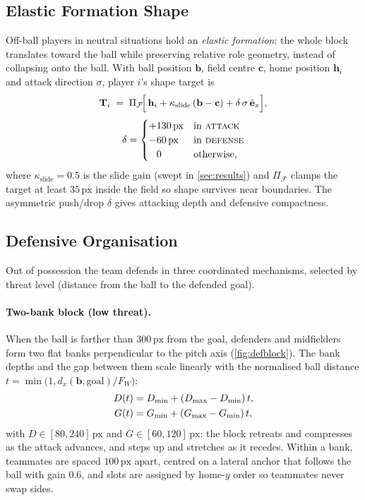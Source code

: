 \documentclass[10pt,twocolumn]{article}
\newcommand{\px}{\ensuremath{\,\mathrm{px}}}
\begin{document}
\subsection{Elastic Formation Shape}\label{sec:formation}

Off-ball players in neutral situations hold an \emph{elastic formation}: the
whole block translates toward the ball while preserving relative role
geometry, instead of collapsing onto the ball. With ball position
$\mathbf b$, field centre $\mathbf c$, home position $\mathbf h_i$ and
attack direction $\sigma$, player $i$'s shape target is
\begin{equation}\label{eq:formation}
\mathbf T_i \;=\; \Pi_{\mathcal F}\!\Bigl[\,\mathbf h_i
   + \kappa_{\text{slide}}\,(\mathbf b - \mathbf c)
   + \delta\,\sigma\,\hat{\mathbf e}_x \Bigr],
\end{equation}
\begin{equation}\label{eq:pushdrop}
\delta =
\begin{cases}
+130\px & \text{in \textsc{attack}} \\
-60\px & \text{in \textsc{defense}} \\
\hphantom{+}0 & \text{otherwise,}
\end{cases}
\end{equation}
where $\kappa_{\text{slide}} = 0.5$ is the slide gain (swept in
\cref{sec:results}) and $\Pi_{\mathcal F}$ clamps the target at least
$35\px$ inside the field so shape survives near boundaries. The
asymmetric push/drop $\delta$ gives attacking depth and defensive
compactness.

\subsection{Defensive Organisation}\label{sec:defense}

Out of possession the team defends in three coordinated mechanisms,
selected by threat level (distance from the ball to the defended goal).

\paragraph{Two-bank block (low threat).} When the ball is farther than
$300\px$ from the goal, defenders and midfielders form two flat banks
perpendicular to the pitch axis (\cref{fig:defblock}). The bank depths and
the gap between them scale linearly with the normalised ball distance
$t = \min\!\bigl(1, d_x(\mathbf b, \text{goal})/F_W\bigr)$:
\begin{align}\label{eq:block}
D(t) &= D_{\min} + (D_{\max}-D_{\min})\,t, \\
G(t) &= G_{\min} + (G_{\max}-G_{\min})\,t, \notag
\end{align}
with $D \in [80, 240]\px$ and $G \in [60,120]\px$: the block retreats and
compresses as the attack advances, and steps up and stretches as it
recedes. Within a bank, teammates are spaced $100\px$ apart, centred on a
lateral anchor that follows the ball with gain $0.6$, and slots are
assigned by home-$y$ order so teammates never swap sides.
\end{document}
